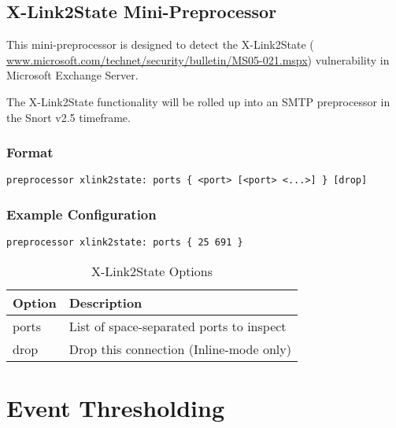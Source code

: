 \documentclass[english]{report}
\newenvironment{note}{
\samepage
    \vspace{10pt}{\textsf{
        {\hspace{7pt}\Huge{$\triangle$\hspace{-12.5pt}{\Large{$^!$}}}}\hspace{5pt}
        {\Large{NOTE}}
    }
    }
   \begin{center}
    \par\vspace{-17pt}

    \begin{lrbox}{\savepar}
    \begin{minipage}[r]{6in}
}
{
    \end{minipage}
    \end{lrbox}
    \fbox{
        \usebox{
            \savepar
        }
    }
    \par\vskip10pt
    \end{center}
}
\begin{document}
\subsection{X-Link2State Mini-Preprocessor\label{X-Link2State}}

This mini-preprocessor is designed to detect the X-Link2State (\url{
www.microsoft.com/technet/security/bulletin/MS05-021.mspx}) vulnerability
in Microsoft Exchange Server.

\begin{note}
The X-Link2State functionality will be rolled up into an SMTP
preprocessor in the Snort v2.5 timeframe.
\end{note}

\subsubsection{Format}
\begin{verbatim}
preprocessor xlink2state: ports { <port> [<port> <...>] } [drop]
\end{verbatim}

\subsubsection{Example Configuration}
\begin{verbatim}
preprocessor xlink2state: ports { 25 691 }
\end{verbatim}

\begin{table}[!hbpt]

\caption{X-Link2State Options\label{X-Link2State Options}}

\begin{center}\begin{tabular}{| l | l |}
\hline
\textbf{Option} & \textbf{Description}\\
\hline
\hline
ports & List of space-separated ports to inspect\\
\hline
drop & Drop this connection (Inline-mode only)\\
\hline
\end{tabular}
\end{center}
\end{table}

\clearpage

\section{Event Thresholding}
\end{document}
